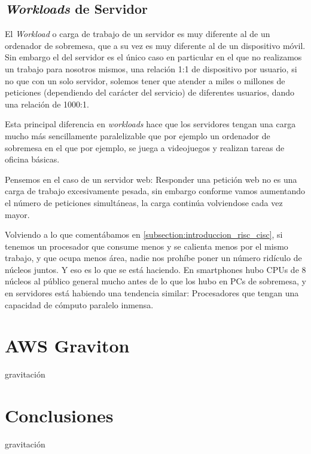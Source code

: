 \documentclass[a4paper,openright,12pt]{article}
\begin{document}
\subsection{\emph{Workloads} de Servidor}\label{subsection:workloads_servidor}
El \emph{Workload} o carga de trabajo de un servidor es muy diferente al de un ordenador de sobremesa, que a su vez es muy diferente al de un dispositivo móvil. Sin embargo el del servidor
es el único caso en particular en el que no realizamos un trabajo para nosotros mismos, una relación 1:1 de dispositivo por usuario, si no que con un solo servidor, solemos tener que atender
a miles o millones de peticiones (dependiendo del carácter del servicio) de diferentes usuarios, dando una relación de 1000:1.

Esta principal diferencia en \emph{workloads} hace que los servidores tengan una carga mucho más sencillamente paralelizable que por ejemplo un ordenador de sobremesa en el que por ejemplo,
se juega a videojuegos y realizan tareas de oficina básicas.

Pensemos en el caso de un servidor web: Responder una petición web no es una carga de trabajo excesivamente pesada, sin embargo conforme vamos aumentando el número de peticiones simultáneas,
la carga continúa volviendose cada vez mayor.

Volviendo a lo que comentábamos en \ref{subsection:introduccion_risc_cisc}, si tenemos un procesador que consume menos y se calienta menos por el mismo trabajo, y que ocupa menos área, nadie
nos prohíbe poner un número ridículo de núcleos juntos. Y eso es lo que se está haciendo. En smartphones hubo CPUs de 8 núcleos al público general mucho antes de lo que los hubo en PCs de
sobremesa, y en servidores está habiendo una tendencia similar: Procesadores que tengan una capacidad de cómputo paralelo inmensa. \parencite{ampere_announces_128_core_arm_server_cpu}

\section{AWS Graviton}
gravitación

\section{Conclusiones}
gravitación


\clearpage
\begin{flushleft}
\printbibliography[]{}
\end{flushleft}
\end{document}
